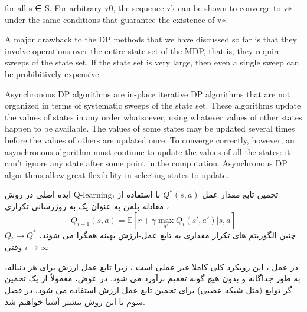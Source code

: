 for all s ∈ S. For arbitrary v0, the sequence {vk} can be shown to converge to v∗ under the same
conditions that guarantee the existence of v∗.



A major drawback to the DP methods that we have discussed so far is that they involve operations
over the entire state set of the MDP, that is, they require sweeps of the state set. If the state set is very
large, then even a single sweep can be prohibitively expensive


Asynchronous DP algorithms are in-place iterative DP algorithms that are not organized in terms
of systematic sweeps of the state set. These algorithms update the values of states in any order
whatsoever, using whatever values of other states happen to be available. The values of some states
may be updated several times before the values of others are updated once. To converge correctly,
however, an asynchronous algorithm must continue to update the values of all the states: it can’t ignore
any state after some point in the computation. Asynchronous DP algorithms allow great flexibility in
selecting states to update.

ایده اصلی در روش Q-learning، تخمین تابع مقدار عمل  
$Q^*(s,a)$ 
با استفاده از معادله بلمن به عنوان یک به روزرسانی تکراری ،
$$Q_{i+1}(s,a) = \mathbb{E}[r+ \gamma \max_{a'} Q_i(s',a')|s,a]$$
چنین الگوریتم های تکرار مقداری به تابع عمل-ارزش بهینه همگرا می شوند، 
$Q_i \longrightarrow Q^*$
وقتی
$i \longrightarrow \infty$

در عمل ، این رویکرد کلی کاملا غیر عملی است ،
زیرا تابع عمل-ارزش برای هر دنباله، به طور جداگانه و بدون هیچ گونه تعمیم برآورد می شود. در عوض، معمولاً از یک تخمین گر توابع (مثل شبکه عصبی) برای تخمین تابع عمل-ارزش استفاده می شود، در فصل سوم با این روش بیشتر آشنا خواهیم شد.